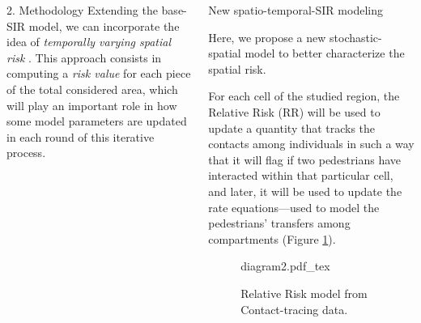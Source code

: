 \documentclass[12pt]{beamer}
\begin{document}
\begin{frame}[t]
\begin{columns}[t]
\begin{column}{0.30\textwidth}
\begin{block}{\Large 2. Methodology}
			Extending the base-SIR model, we can  incorporate the idea of \textit{temporally varying spatial risk} \cite{mahmood2021contextual}. This approach consists in computing a \textit{risk value} for each piece of the total considered area, which will play an important role in how some model parameters are updated in each round of this iterative process. 
			
			\end{block}
				
			\end{column}
		
			\begin{column}{0.30\textwidth} \justifying %
				
			{\large \textcolor{title-fg}{New spatio-temporal-SIR modeling}} \vspace{12pt}
			
			Here, we propose a new stochastic-spatial model to better characterize the spatial risk. \vspace{12pt}
			
			For each cell of the studied region, the Relative Risk (RR) will be used to update a quantity that tracks the contacts among individuals in such a way that it will flag if two pedestrians have interacted within that particular cell, and later, it will be used to update the rate equations---used to model the pedestrians' transfers among compartments (Figure \ref{fig:rr-modeling}).\vspace{12pt}
			
			\begin{figure}[!ht]
				\centering
				\def\svgwidth{\columnwidth}{diagram2.pdf_tex}
				\caption{\justifying Relative Risk model from Contact-tracing data.}
				\label{fig:rr-modeling}
			\end{figure}
			

\end{column}
\end{columns}
\end{frame}
\end{document}
